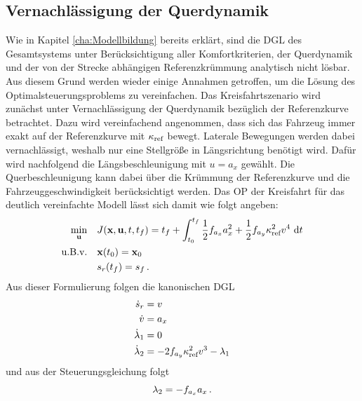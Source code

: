\subsection{Vernachlässigung der Querdynamik}\label{subsec:Kreisfahrt_ohne_Querdynamik}
Wie in Kapitel \ref{cha:Modellbildung} bereits erklärt, sind die \gls{DGL} des Gesamtsystems unter Berücksichtigung aller Komfortkriterien, der Querdynamik und der von der Strecke abhängigen Referenzkrümmung analytisch nicht lösbar. Aus diesem Grund werden wieder einige Annahmen getroffen, um die Lösung des Optimalsteuerungsproblems zu vereinfachen. Das Kreisfahrtszenario wird zunächst unter Vernachlässigung der Querdynamik bezüglich der Referenzkurve betrachtet. Dazu wird vereinfachend angenommen, dass sich das Fahrzeug immer exakt auf der Referenzkurve mit $\kappa_{\textrm{ref}}$ bewegt. Laterale Bewegungen werden dabei vernachlässigt, weshalb nur eine Stellgröße in Längsrichtung benötigt wird. Dafür wird nachfolgend die Längsbeschleunigung mit $u = a_x$ gewählt. Die Querbeschleunigung kann dabei über die Krümmung der Referenzkurve und die Fahrzeuggeschwindigkeit berücksichtigt werden. Das \gls{OP} der Kreisfahrt für das deutlich vereinfachte Modell lässt sich damit wie folgt angeben: 
\begin{align}
\min_{\boldsymbol{\mathrm{u}}} \quad & J(\boldsymbol{\mathrm{x}},\boldsymbol{\mathrm{u}},t,t_f) = t_f + \int_{t_0}^{t_f}\frac{1}{2}f_{a_x} a_x^2 + \frac{1}{2}f_{a_y} \kappa_{\textrm{ref}}^2v^4~\textrm{d}{t} \\
\textrm{u.B.v.} \quad& \boldsymbol{\mathrm{x}}(t_0) = \boldsymbol{\mathrm{x}}_0 \\
& s_r(t_f ) = s_f\,.
\end{align}
Aus dieser Formulierung folgen die kanonischen \gls{DGL} 
\begin{align}
\dot{s}_r &= v \\
\dot{v} &= a_x \label{eq:dot_v_ax}\\
\dot{\lambda}_1 &= 0 \\
\dot{\lambda}_2 &= -2f_{a_y} \kappa_{\textrm{ref}}^2v^3 - \lambda_1 \label{eq:dot_l2_Kreisfahrt}
\end{align}
und aus der Steuerungsgleichung folgt
\begin{equation}
	\lambda_2 = -f_{a_x} a_x\,. \label{eq:l2_Kreisfahrt}
\end{equation}
